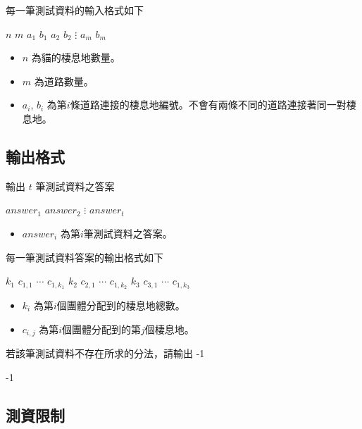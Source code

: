 每一筆測試資料的輸入格式如下

\begin{format}
\f{
$n$ $m$
$a_1$ $b_1$
$a_2$ $b_2$
$\vdots$
$a_m$ $b_m$
}
\end{format}

\begin{itemize}
\tightlist
\item
  \(n\) 為貓的棲息地數量。
\item
  \(m\) 為道路數量。
\item
  \(a_i\), \(b_i\)
  為第\(i\)條道路連接的棲息地編號。不會有兩條不同的道路連接著同一對棲息地。
\end{itemize}

\subsection{輸出格式}

輸出 \(t\) 筆測試資料之答案

\begin{format}
\f{
$answer_1$
$answer_2$
$\vdots$
$answer_t$
}
\end{format}

\begin{itemize}
\tightlist
\item
  \(answer_i\) 為第\(i\)筆測試資料之答案。
\end{itemize}

每一筆測試資料答案的輸出格式如下

\begin{format}
\f{
$k_1$ $c_{1,1}$ $\cdots$ $c_{1,k_1}$
$k_2$ $c_{2,1}$ $\cdots$ $c_{1,k_2}$
$k_3$ $c_{3,1}$ $\cdots$ $c_{1,k_3}$
}
\end{format}

\begin{itemize}
\tightlist
\item
  \(k_i\) 為第\(i\)個團體分配到的棲息地總數。
\item
  \(c_{i,j}\) 為第\(i\)個團體分配到的第\(j\)個棲息地。
\end{itemize}

若該筆測試資料不存在所求的分法，請輸出 -1

\begin{format}
\f{
-1
}
\end{format}

\subsection{測資限制}

